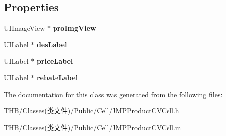 \subsection*{Properties}
\begin{DoxyCompactItemize}
\item 
\mbox{\label{interface_j_m_p_product_c_v_cell_a6365fcf123f3dd2b0c1e518eac33e31b}} 
U\+I\+Image\+View $\ast$ {\bfseries pro\+Img\+View}
\item 
\mbox{\label{interface_j_m_p_product_c_v_cell_aa685b404f5d8a8406cc5438d815df8d6}} 
U\+I\+Label $\ast$ {\bfseries des\+Label}
\item 
\mbox{\label{interface_j_m_p_product_c_v_cell_a7f92b5830d2d550d49eec7b3de843f84}} 
U\+I\+Label $\ast$ {\bfseries price\+Label}
\item 
\mbox{\label{interface_j_m_p_product_c_v_cell_a1768760e140710ed269975b0dd71602c}} 
U\+I\+Label $\ast$ {\bfseries rebate\+Label}
\end{DoxyCompactItemize}


The documentation for this class was generated from the following files\+:\begin{DoxyCompactItemize}
\item 
T\+H\+B/\+Classes(类文件)/\+Public/\+Cell/J\+M\+P\+Product\+C\+V\+Cell.\+h\item 
T\+H\+B/\+Classes(类文件)/\+Public/\+Cell/J\+M\+P\+Product\+C\+V\+Cell.\+m\end{DoxyCompactItemize}
